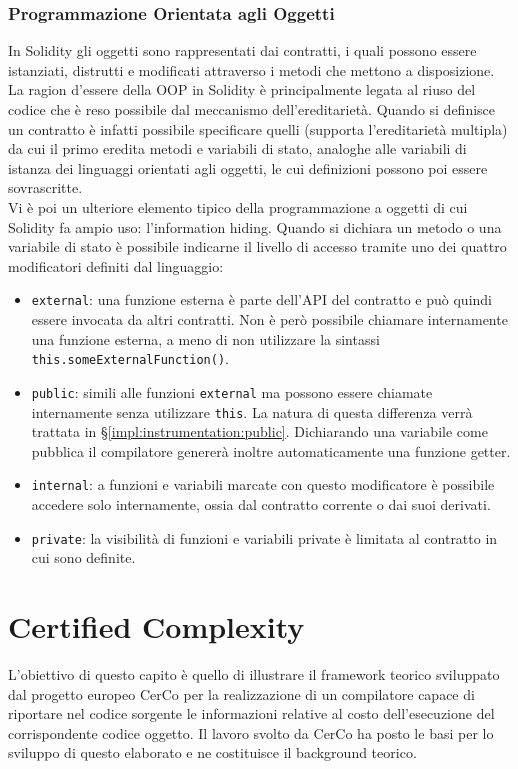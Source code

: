 \documentclass[12pt,a4paper,openright,oneside]{report}
\theoremstyle{definition}
\begin{document}
\subsection{Programmazione Orientata agli Oggetti}\label{bg:solidity:oop}
In Solidity gli oggetti sono rappresentati dai contratti, i quali possono essere istanziati, distrutti e modificati attraverso i metodi che mettono a disposizione. La ragion d'essere della OOP in Solidity \`{e} principalmente legata al riuso del codice che \`{e} reso possibile dal meccanismo dell'ereditariet\`{a}. Quando si definisce un contratto \`{e} infatti possibile specificare quelli (supporta l'ereditariet\`{a} multipla) da cui il primo eredita metodi e variabili di stato, analoghe alle variabili di istanza dei linguaggi orientati agli oggetti, le cui definizioni possono poi essere sovrascritte.\\
Vi \`{e} poi un ulteriore elemento tipico della programmazione a oggetti di cui Solidity fa ampio uso: l'information hiding. Quando si dichiara un metodo o una variabile di stato \`{e} possibile indicarne il livello di accesso tramite uno dei quattro modificatori definiti dal linguaggio:
\begin{itemize}
    \item \texttt{external}: una funzione esterna \`{e} parte dell'API del contratto e pu\`{o} quindi essere invocata da altri contratti. Non \`{e} per\`{o} possibile chiamare internamente una funzione esterna, a meno di non utilizzare la sintassi \texttt{this.someExternalFunction()}.
    \item \texttt{public}: simili alle funzioni \texttt{external} ma possono essere chiamate internamente senza utilizzare \texttt{this}. La natura di questa differenza verr\`{a} trattata in \S\ref{impl:instrumentation:public}. Dichiarando una variabile come pubblica il compilatore generer\`{a} inoltre automaticamente una funzione getter.
    \item \texttt{internal}: a funzioni e variabili marcate con questo modificatore \`{e} possibile accedere solo internamente, ossia dal contratto corrente o dai suoi derivati.
    \item \texttt{private}: la visibilit\`{a} di funzioni e variabili private \`{e} limitata al contratto in cui sono definite.
\end{itemize}

\chapter{Certified Complexity}\label{cerco}
L'obiettivo di questo capito \`{e} quello di illustrare il framework teorico sviluppato dal progetto europeo CerCo \cite{cerco_website} per la realizzazione di un compilatore capace di riportare nel codice sorgente le informazioni relative al costo dell'esecuzione del corrispondente codice oggetto. Il lavoro svolto da CerCo ha posto le basi per lo sviluppo di questo elaborato e ne costituisce il background teorico.
\end{document}
